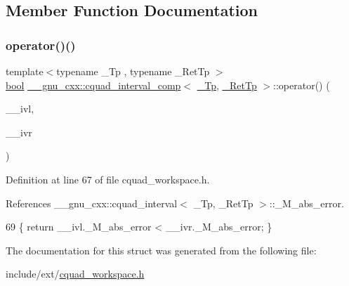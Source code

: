 \subsection{Member Function Documentation}
\mbox{\label{struct____gnu__cxx_1_1cquad__interval__comp_ac0a0d43bec114cb4d09639ae6b21085d}} 
\subsubsection{\texorpdfstring{operator()()}{operator()()}}
{\footnotesize\ttfamily template$<$typename \+\_\+\+Tp , typename \+\_\+\+Ret\+Tp $>$ \\
\hyperlink{namespace____gnu__cxx_ae83aca57f97767d5d09188718728a0ac}{bool} \hyperlink{struct____gnu__cxx_1_1cquad__interval__comp}{\+\_\+\+\_\+gnu\+\_\+cxx\+::cquad\+\_\+interval\+\_\+comp}$<$ \hyperlink{namespace____gnu__cxx_a3b19a9c800ca194374ef9172290f7d79}{\+\_\+\+Tp}, \hyperlink{namespace____gnu__cxx_a886e03ece3d53ff7fa6c098a40f93fa5}{\+\_\+\+Ret\+Tp} $>$\+::operator() (\begin{DoxyParamCaption}\item[{const \hyperlink{struct____gnu__cxx_1_1cquad__interval}{cquad\+\_\+interval}$<$ \hyperlink{namespace____gnu__cxx_a3b19a9c800ca194374ef9172290f7d79}{\+\_\+\+Tp}, \hyperlink{namespace____gnu__cxx_a886e03ece3d53ff7fa6c098a40f93fa5}{\+\_\+\+Ret\+Tp} $>$ \&}]{\+\_\+\+\_\+ivl,  }\item[{const \hyperlink{struct____gnu__cxx_1_1cquad__interval}{cquad\+\_\+interval}$<$ \hyperlink{namespace____gnu__cxx_a3b19a9c800ca194374ef9172290f7d79}{\+\_\+\+Tp}, \hyperlink{namespace____gnu__cxx_a886e03ece3d53ff7fa6c098a40f93fa5}{\+\_\+\+Ret\+Tp} $>$ \&}]{\+\_\+\+\_\+ivr }\end{DoxyParamCaption})\hspace{0.3cm}{\ttfamily [inline]}}



Definition at line 67 of file cquad\+\_\+workspace.\+h.



References \+\_\+\+\_\+gnu\+\_\+cxx\+::cquad\+\_\+interval$<$ \+\_\+\+Tp, \+\_\+\+Ret\+Tp $>$\+::\+\_\+\+M\+\_\+abs\+\_\+error.


\begin{DoxyCode}
69       \{ \textcolor{keywordflow}{return} \_\_ivl.\_M\_abs\_error < \_\_ivr.\_M\_abs\_error; \}
\end{DoxyCode}


The documentation for this struct was generated from the following file\+:\begin{DoxyCompactItemize}
\item 
include/ext/\hyperlink{cquad__workspace_8h}{cquad\+\_\+workspace.\+h}\end{DoxyCompactItemize}
